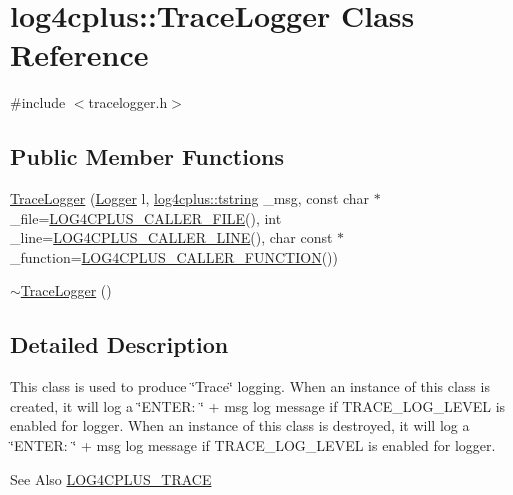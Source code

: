 \hypertarget{classlog4cplus_1_1TraceLogger}{\section{log4cplus\-:\-:Trace\-Logger Class Reference}
\label{classlog4cplus_1_1TraceLogger}
}


{\ttfamily \#include $<$tracelogger.\-h$>$}

\subsection*{Public Member Functions}
\begin{DoxyCompactItemize}
\item 
\hyperlink{classlog4cplus_1_1TraceLogger_aaaaecc309e12678a28064f0e0643ad9e}{Trace\-Logger} (\hyperlink{classlog4cplus_1_1Logger}{Logger} l, \hyperlink{namespacelog4cplus_a3c9287f6ebcddc50355e29d71152117b}{log4cplus\-::tstring} \-\_\-msg, const char $\ast$\-\_\-file=\hyperlink{config_8hxx_a5144d414ec4fb810aa59271f5d0aeb5e}{L\-O\-G4\-C\-P\-L\-U\-S\-\_\-\-C\-A\-L\-L\-E\-R\-\_\-\-F\-I\-L\-E}(), int \-\_\-line=\hyperlink{config_8hxx_ac1ce89aeb47843333638b5dd1c2167ef}{L\-O\-G4\-C\-P\-L\-U\-S\-\_\-\-C\-A\-L\-L\-E\-R\-\_\-\-L\-I\-N\-E}(), char const $\ast$\-\_\-function=\hyperlink{config_8hxx_a1f16f08f13e1d3c6896c81fdc3b04036}{L\-O\-G4\-C\-P\-L\-U\-S\-\_\-\-C\-A\-L\-L\-E\-R\-\_\-\-F\-U\-N\-C\-T\-I\-O\-N}())
\item 
\hyperlink{classlog4cplus_1_1TraceLogger_ad9318b831147060e5a7c9f6396b80b15}{$\sim$\-Trace\-Logger} ()
\end{DoxyCompactItemize}


\subsection{Detailed Description}
This class is used to produce \char`\"{}\-Trace\char`\"{} logging. When an instance of this class is created, it will log a {\ttfamily \char`\"{}\-E\-N\-T\-E\-R\-: \char`\"{} + msg} log message if T\-R\-A\-C\-E\-\_\-\-L\-O\-G\-\_\-\-L\-E\-V\-E\-L is enabled for {\ttfamily logger}. When an instance of this class is destroyed, it will log a {\ttfamily \char`\"{}\-E\-N\-T\-E\-R\-: \char`\"{} + msg} log message if T\-R\-A\-C\-E\-\_\-\-L\-O\-G\-\_\-\-L\-E\-V\-E\-L is enabled for {\ttfamily logger}. 

\begin{DoxySeeAlso}{See Also}
\hyperlink{loggingmacros_8h_a23a8edabec9f5d7f73cdbb99518e17a0}{L\-O\-G4\-C\-P\-L\-U\-S\-\_\-\-T\-R\-A\-C\-E} 
\end{DoxySeeAlso}


